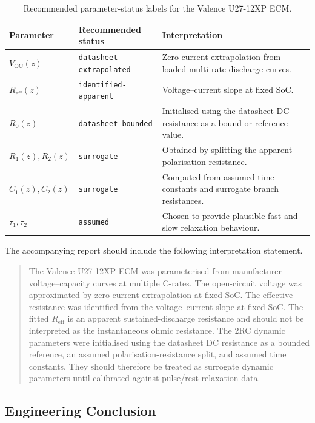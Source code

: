 \documentclass[a4paper,12pt]{article}
\begin{document}
\begin{table}[H]
\centering
\caption{Recommended parameter-status labels for the Valence U27-12XP ECM.}
\label{tab:method_parameter_status}
\begin{tabularx}{0.96\textwidth}{@{}L{0.25\textwidth}L{0.30\textwidth}Y@{}}
\toprule
\textbf{Parameter} &
\textbf{Recommended status} &
\textbf{Interpretation} \\
\midrule
\(V_{\mathrm{OC}}(z)\) &
\texttt{datasheet-extrapolated} &
Zero-current extrapolation from loaded multi-rate discharge curves. \\
\(R_{\mathrm{eff}}(z)\) &
\texttt{identified-apparent} &
Voltage--current slope at fixed SoC. \\
\(R_0(z)\) &
\texttt{datasheet-bounded} &
Initialised using the datasheet DC resistance as a bound or reference value. \\
\(R_1(z),R_2(z)\) &
\texttt{surrogate} &
Obtained by splitting the apparent polarisation resistance. \\
\(C_1(z),C_2(z)\) &
\texttt{surrogate} &
Computed from assumed time constants and surrogate branch resistances. \\
\(\tau_1,\tau_2\) &
\texttt{assumed} &
Chosen to provide plausible fast and slow relaxation behaviour. \\
\bottomrule
\end{tabularx}
\end{table}

The accompanying report should include the following interpretation statement.

\begin{quote}
The Valence U27-12XP ECM was parameterised from manufacturer voltage--capacity curves at multiple C-rates.
The open-circuit voltage was approximated by zero-current extrapolation at fixed SoC.
The effective resistance was identified from the voltage--current slope at fixed SoC.
The fitted \(R_{\mathrm{eff}}\) is an apparent sustained-discharge resistance and should not be interpreted as the instantaneous ohmic resistance.
The 2RC dynamic parameters were initialised using the datasheet DC resistance as a bounded reference, an assumed polarisation-resistance split, and assumed time constants.
They should therefore be treated as surrogate dynamic parameters until calibrated against pulse/rest relaxation data.
\end{quote}

\subsection{Engineering Conclusion}
\end{document}
